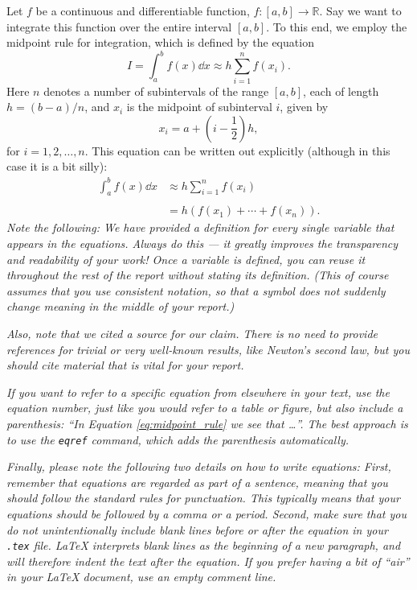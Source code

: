 \documentclass[../main_proj3.tex]{subfiles}
\begin{document}
Let $f$ be a continuous and differentiable function, $f: [a,b] \to \mathbb{R}$. Say we want to integrate this function over the entire interval $[a,b]$. To this end, we employ the midpoint rule for integration, which is defined by the equation~\cite{Linear_Algebra_and_its_Applications}
%
\begin{equation}
\label{eq:midpoint_rule}
    I = \int_a^b f(x)\dd x \approx h\sum_{i=1}^{n} f(x_i).
\end{equation}
Here $n$ denotes a number of subintervals of the range $[a,b]$, each of length $h = (b-a)/n$, and $x_i$ is the midpoint of subinterval $i$, given by
\begin{equation}
   x_i = a + \left(i-\frac{1}{2}\right) h,
\end{equation}
for $i = 1, 2, \ldots, n$. This equation can be written out explicitly (although in this case it is a bit silly):
%
\begin{equation}
    \begin{split}
        \int_a^b f(x)\dd x & \approx h \sum_{i=1}^{n} f(x_i) \\
                                    \\
                                    & = h\left(f(x_1) + \cdots + f(x_{n})\right).
    \end{split}
\end{equation}
%
\textit{Note the following: We have provided a definition for every single variable that appears in the equations. Always do this --- it greatly improves the transparency and readability of your work! Once a variable is defined, you can reuse it throughout the rest of the report without stating its definition. (This of course assumes that you use consistent notation, so that a symbol does not suddenly change meaning in the middle of your report.)}

\textit{Also, note that we cited a source for our claim. There is no need to provide references for trivial or very well-known results, like Newton's second law, but you should cite material that is vital for your report.}

\textit{If you want to refer to a specific equation from elsewhere in your text, use the equation number, just like you would refer to a table or figure, but also include a parenthesis: ``In Equation \eqref{eq:midpoint_rule} we see that \ldots''. The best approach is to use the \texttt{eqref} command, which adds the parenthesis automatically.} 

\textit{Finally, please note the following two details on how to write equations: First, remember that equations are regarded as part of a sentence, meaning that you should follow the standard rules for punctuation. This typically means that your equations should be followed by a comma or a period. Second, make sure that you do not unintentionally include blank lines before or after the equation in your \texttt{.tex} file. LaTeX interprets blank lines as the beginning of a new paragraph, and will therefore indent the text after the equation. If you prefer having a bit of ``air'' in your LaTeX document, use an empty comment line.}
\end{document}
